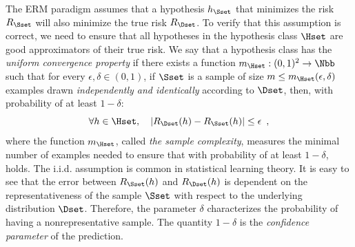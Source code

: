 The ERM paradigm assumes that a hypothesis $h_\Sset$ that minimizes the risk $R_\Sset$ will also minimize the true risk $R_\Dset$.
To verify that this assumption is correct, we need to ensure that all hypotheses in the hypothesis class $\Hset$ are good approximators of their true risk.
We say that a hypothesis class has the \emph{uniform convergence property} if there exists a function $m_\Hset:(0, 1)^2 \rightarrow \Nbb$ such that for every $\epsilon, \delta \in (0, 1)$, if $\Sset$ is a sample of size $m \leq m_\Hset(\epsilon, \delta)$ examples drawn \emph{independently and identically} according to $\Dset$, then, with probability of at least $1 - \delta$:
\begin{equation} \label{equation:ch2-eps_representative}
  \forall h \in \Hset, \quad |R_\Dset(h) - R_\Sset(h)| \leq \epsilon \enspace,
\end{equation}
where the function $m_\Hset$, called \emph{the sample complexity}, measures the minimal number of examples needed to ensure that with probability of at least $1 - \delta$,  holds.
The i.i.d. assumption is common in statistical learning theory.
It is easy to see that the error between $R_\Sset(h)$ and $R_\Dset(h)$ is dependent on the representativeness of the sample $\Sset$ with respect to the underlying distribution $\Dset$.
Therefore, the parameter $\delta$ characterizes the probability of having a nonrepresentative sample.
The quantity $1 - \delta$ is the \emph{confidence parameter} of the prediction.



